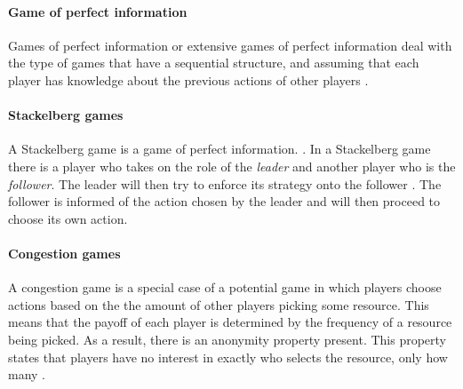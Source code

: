 \paragraph{Game of perfect information}
Games of perfect information or extensive games of perfect information deal with the type of games that have a sequential structure, and assuming that each player has knowledge about the previous actions of other players \cite{CourseInGameTheory}.

\paragraph{Stackelberg games}
A Stackelberg game is a game of perfect information. \cite{CourseInGameTheory}.
In a Stackelberg game there is a player who takes on the role of the \textit{leader} and another player who is the \textit{follower}. The leader will then try to enforce its strategy onto the follower \cite{ShohamLeyton-Brown2008}. The follower is informed of the action chosen by the leader and will then proceed to choose its own action.

\paragraph{Congestion games}
A congestion game is a special case of a potential game \cite{IbarsNavarroGiupponi2010, MondererShapley1996, ShohamLeyton-Brown2008} in which players choose actions based on the the amount of other players picking some resource. This means that the payoff of each player is determined by the frequency of a resource being picked. As a result, there is an anonymity property present. This property states that players have no interest in exactly who selects the resource, only how many \cite{ShohamLeyton-Brown2008}.



